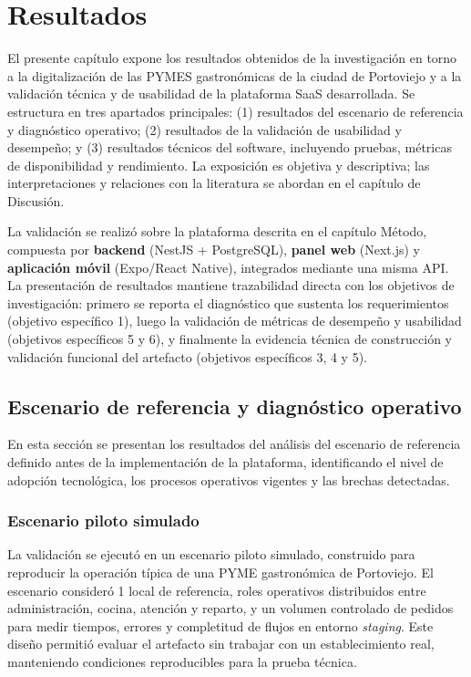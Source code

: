 \chapter{Resultados}


El presente capítulo expone los resultados obtenidos de la investigación en torno a la digitalización de las PYMES gastronómicas de la ciudad de Portoviejo y a la validación técnica y de usabilidad de la plataforma SaaS desarrollada. Se estructura en tres apartados principales: (1) resultados del escenario de referencia y diagnóstico operativo; (2) resultados de la validación de usabilidad y desempeño; y (3) resultados técnicos del software, incluyendo pruebas, métricas de disponibilidad y rendimiento. La exposición es objetiva y descriptiva; las interpretaciones y relaciones con la literatura se abordan en el capítulo de Discusión.

La validación se realizó sobre la plataforma descrita en el capítulo Método, compuesta por \textbf{backend} (NestJS + PostgreSQL), \textbf{panel web} (Next.js) y \textbf{aplicación móvil} (Expo/React Native), integrados mediante una misma API. La presentación de resultados mantiene trazabilidad directa con los objetivos de investigación: primero se reporta el diagnóstico que sustenta los requerimientos (objetivo específico 1), luego la validación de métricas de desempeño y usabilidad (objetivos específicos 5 y 6), y finalmente la evidencia técnica de construcción y validación funcional del artefacto (objetivos específicos 3, 4 y 5).

\section{Escenario de referencia y diagnóstico operativo}

En esta sección se presentan los resultados del análisis del escenario de referencia definido antes de la implementación de la plataforma, identificando el nivel de adopción tecnológica, los procesos operativos vigentes y las brechas detectadas.

\subsection{Escenario piloto simulado}

La validación se ejecutó en un escenario piloto simulado, construido para reproducir la operación típica de una PYME gastronómica de Portoviejo. El escenario consideró 1 local de referencia, roles operativos distribuidos entre administración, cocina, atención y reparto, y un volumen controlado de pedidos para medir tiempos, errores y completitud de flujos en entorno \textit{staging}. Este diseño permitió evaluar el artefacto sin trabajar con un establecimiento real, manteniendo condiciones reproducibles para la prueba técnica.

